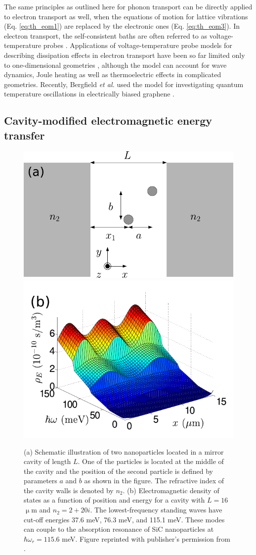 The same principles as outlined here for phonon transport can be directly applied to electron transport as well, when the equations of motion for lattice vibrations (Eq. \eqref{eq:th_eom1}) are replaced by the electronic ones (Eq. \eqref{eq:th_eom3}). In electron transport, the self-consistent baths are often referred to as voltage-temperature probes \cite{jacquet09}. Applications of voltage-temperature probe models for describing dissipation effects in electron transport have been so far limited only to one-dimensional geometries \cite{buttiker86,damato90,jacquet09,jacquet12}, although the model can account for wave dynamics, Joule heating as well as thermoelectric effects \cite{roy07} in complicated geometries. Recently, Bergfield \textit{et al.} used the model for investigating quantum temperature oscillations in electrically biased graphene \cite{bergfield15}.

\subsection{Cavity-modified electromagnetic energy transfer}
\label{sec:results_cavity}

\begin{figure}
 \includegraphics[width=.55\columnwidth]{pics/dipole_fig2.pdf}
 \includegraphics[width=.44\columnwidth]{pics/dipole_fig3a_mod.pdf}
 \caption{(a) Schematic illustration of two nanoparticles located in a mirror cavity of length $L$. One of the particles is located at the middle of the cavity and the position of the second particle is defined by parameters $a$ and $b$ as shown in the figure. The refractive index of the cavity walls is denoted by $n_2$. (b) Electromagnetic density of states as a function of position and energy for a cavity with $L=16$ $\upmu$m and $n_2=2+20i$. The lowest-frequency standing waves have cut-off energies 37.6 meV, 76.3 meV, and 115.1 meV. These modes can couple to the absorption resonance of SiC nanoparticles at $\hbar\omega_r=115.6$ meV. Figure reprinted with publisher's permission from .}
\label{fig:gfm_dipole_system}
\end{figure}

